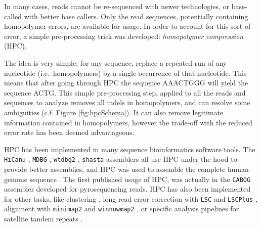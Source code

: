 \documentclass[
  11pt,
  twoside,
  BCOR=10mm,
  listof=totoc]{scrbook}
\begin{document}
In many cases, reads cannot be re-sequenced with newer technologies, or base-called with better base callers. Only the read sequences, potentially containing homopolymer errors, are available for usage. In order to account for this sort of error, a simple pre-processing trick was developed: \emph{homopolymer compression} (HPC).

The idea is very simple: for any sequence, replace a repeated run of any nucleotide (i.e.~homopolymers) by a single occurrence of that nucleotide. This means that after going through HPC the sequence AAACTGGG will yield the sequence ACTG. This simple pre-processing step, applied to all the reads and sequences to analyze removes all indels in homopolymers, and can resolve some ambiguities (c.f. Figure \ref{fig:hpcSchema}). It can also remove legitimate information contained in homopolymers, however the trade-off with the reduced error rate has been deemed advantageous.

HPC has been implemented in many sequence bioinformatics software tools. The \texttt{HiCanu} \autocite{nurkHiCanuAccurateAssembly2020}, \texttt{MDBG} \autocite{ekimMinimizerspaceBruijnGraphs2021}, \texttt{wtdbg2} \autocite{ruanFastAccurateLongread2020}, \texttt{shasta} \autocite{shafinNanoporeSequencingShasta2020} assemblers all use HPC under the hood to provide better assemblies, and HPC was used to assemble the complete human genome sequence \autocite{nurk2022}. The first published usage of HPC, was actually in the \texttt{CABOG} assembler \autocite{millerAggressiveAssemblyPyrosequencing2008} developed for pyrosequencing reads. HPC has also been implemented for other tasks, like clustering \autocite{sahlinNovoClusteringLongRead2020}, long read error correction with \texttt{LSC} \autocite{auImprovingPacBioLong2012} and \texttt{LSCPlus} \autocite{huLSCplusFastSolution2016}, alignment with \texttt{minimap2} \autocite{liMinimap2PairwiseAlignment2018} and \texttt{winnowmap2} \autocite{jainWeightedMinimizerSampling2020}, or specific analysis pipelines for satellite tandem repeats \autocite{vannesteForensicSTRAnalysis2012}.
\end{document}
